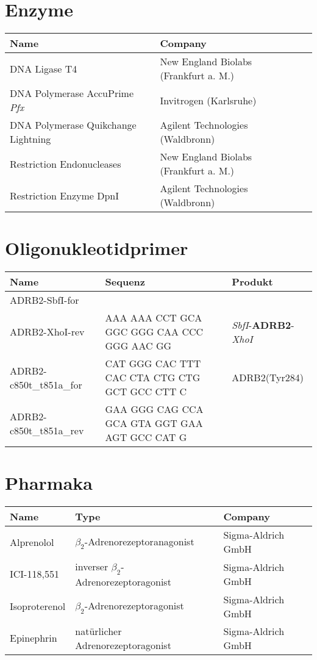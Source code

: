 \section{Enzyme}

\begin{tabular}{lll}
\toprule
Name							&	Company\\
\midrule
DNA Ligase T4						&	New England Biolabs (Frankfurt a. M.)\\
DNA Polymerase AccuPrime \textit{Pfx}	&	Invitrogen (Karlsruhe)\\
DNA Polymerase Quikchange Lightning	&	Agilent Technologies (Waldbronn)\\
Restriction Endonucleases			&	New England Biolabs (Frankfurt a. M.)\\
Restriction Enzyme DpnI				&	Agilent Technologies (Waldbronn)\\
\bottomrule
		
\end {tabular}


\section{Oligonukleotidprimer}

\begin{tabular}{lll}
\toprule
Name		&	Sequenz 					&	Produkt\\
\midrule
ADRB2-SbfI-for	&&\\
ADRB2-XhoI-rev	&	AAA AAA CCT GCA GGC GGG CAA CCC GGG AAC GG	&	\textit{SbfI}-\textbf{ADRB2}-\textit{XhoI}\\
ADRB2-c850t\_t851a\_for	& 	CAT GGG CAC TTT CAC CTA CTG CTG GCT GCC CTT C & ADRB2(Tyr284)\\
ADRB2-c850t\_t851a\_rev	&	GAA GGG CAG CCA GCA GTA GGT GAA AGT GCC CAT G &\\
\bottomrule
\end{tabular}

\section{Pharmaka}
\begin{table}[htsb]
\begin{tabular}{lll}
\toprule
Name			&	Type										&	Company\\
\midrule
Alprenolol		&	$\beta_2$\--Adrenorezeptoranagonist				&	Sigma-Aldrich GmbH\\
ICI-118,551		&	inverser $\beta_2$\--Adrenorezeptoragonist		&	Sigma-Aldrich GmbH\\
Isoproterenol	&	$\beta_2$\--Adrenorezeptoragonist				&	Sigma-Aldrich GmbH\\
Epinephrin		&	natürlicher Adrenorezeptoragonist			& 	Sigma-Aldrich GmbH\\
\bottomrule
\end{tabular}
\end{table}

